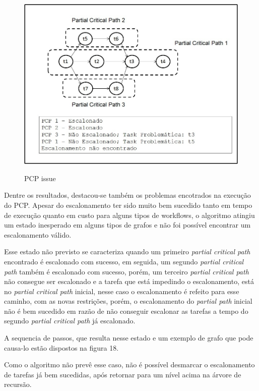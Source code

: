\documentclass[a4paper,10pt]{article}
\begin{document}
\begin{figure}[!htb]

\centering

\includegraphics[scale=.5]{figures/pcp_issue.jpg}
\label{issue_pcp}
\caption{PCP issue}

\end{figure}


Dentre os resultados, destacou-se também os problemas encotrados na execução do PCP. Apesar do escalonamento ter sido muito bem sucedido tanto em tempo de execução quanto em custo para alguns tipos de workflows, o algoritmo atingiu um estado inesperado em alguns tipos de grafos e não foi possível encontrar um escalonamento válido.

Esse estado não previsto se caracteriza quando um primeiro \emph{partial critical path} encontrado é escalonado com sucesso, em seguida, um segundo \emph{partial critical path} também é escalonado com sucesso, porém, um terceiro \emph{partial critical path} não consegue ser escalonado e a tarefa que está impedindo o escalonamento, está no \emph{partial critical path} inicial, nesse caso o escalonamento é refeito para esse caminho, com as novas restrições, porém, o escalonamento do \emph{partial path} inicial não é bem sucedido em razão de não conseguir escalonar as tarefas a tempo do segundo \emph{partial critical path} já escalonado.

A sequencia de passos, que resulta nesse estado e um exemplo de grafo que pode causa-lo estão dispostos na figura 18.

Como o algoritmo não prevê esse caso, não é possível desmarcar o escalonamento de tarefas já bem sucedidas, após retornar para um nível acima na árvore de recursão.
\end{document}
